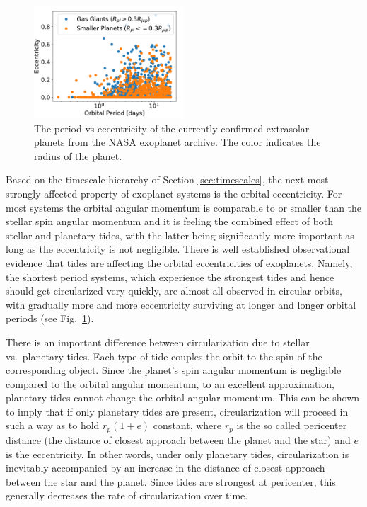 \begin{figure}[t]
%
    \centering
%
    \includegraphics[width=0.5\textwidth]{period_eccentricity.pdf}
%
    \caption{
%
        The period vs eccentricity of the currently confirmed extrasolar planets
        from the NASA exoplanet archive. The color indicates the radius of the
        planet.
%
    }
%
    \label{fig:period-eccentricity}
%
\end{figure}

Based on the timescale hierarchy of Section \ref{sec:timescales}, the next most
strongly affected property of exoplanet systems is the orbital eccentricity.
For most systems the orbital angular momentum is comparable to or smaller than
the stellar spin angular momentum and it is feeling the combined effect of both
stellar and planetary tides, with the latter being significantly more important
as long as the eccentricity is not negligible. There is well established
observational evidence that tides are affecting the orbital eccentricities of
exoplanets. Namely, the shortest period systems, which experience the strongest
tides and hence should get circularized very quickly, are almost all observed in
circular orbits, with gradually more and more eccentricity surviving at longer
and longer orbital periods (see Fig.~\ref{fig:period-eccentricity}).

There is an important difference between circularization due to stellar vs.\
planetary tides. Each type of tide couples the orbit to the spin of the
corresponding object. Since the planet's spin angular momentum is negligible
compared to the orbital angular momentum, to an excellent approximation,
planetary tides cannot change the orbital angular momentum. This can be shown to
imply that if only planetary tides are present, circularization will proceed in
such a way as to hold $r_p(1+e)$ constant, where $r_p$ is the so called
pericenter distance (the distance of closest approach between the planet and the
star) and $e$ is the eccentricity. In other words, under only planetary tides,
circularization is inevitably accompanied by an increase in the distance of
closest approach between the star and the planet. Since tides are strongest at
pericenter, this generally decreases the rate of circularization over time.

